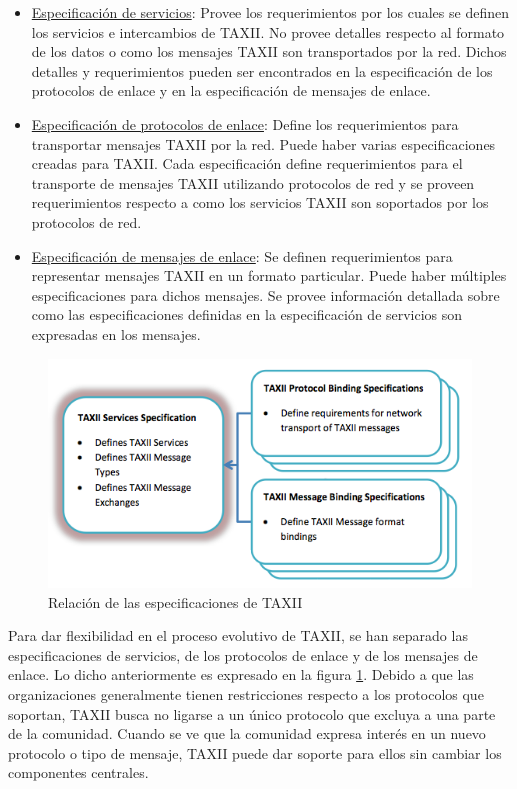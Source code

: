 \begin{itemize}
  \item \underline{Especificación de servicios}: Provee los requerimientos por los cuales se 
  definen los servicios e intercambios de TAXII. No provee detalles respecto al 
  formato de los datos o como los mensajes TAXII son transportados por la red. 
  Dichos detalles y requerimientos pueden ser encontrados en la especificación 
  de los protocolos de enlace y en la especificación de mensajes de enlace.
 \item \underline{Especificación de protocolos de enlace}: Define los requerimientos para 
 transportar mensajes TAXII por la red. Puede haber varias especificaciones 
 creadas para TAXII. Cada especificación define requerimientos para el 
 transporte de mensajes TAXII utilizando protocolos de red y se proveen 
 requerimientos respecto a como los servicios TAXII son soportados por los 
 protocolos de red.
 \item \underline{Especificación de mensajes de enlace}: Se definen requerimientos para 
 representar mensajes TAXII en un formato particular. Puede haber múltiples 
 especificaciones para dichos mensajes. Se provee información detallada sobre 
 como las especificaciones definidas en la especificación de servicios son 
 expresadas en los mensajes.
\end{itemize}

\begin{figure}[ht!]
  \centering
    \includegraphics[width=150mm]{./images/TAXIIEspecification.png}
    \caption{Relación de las especificaciones de TAXII \protect\cite{b1}}
    \label{fig.taxii_rel_spec}
\end{figure}

Para dar flexibilidad en el proceso evolutivo de TAXII, se han separado las 
especificaciones de servicios, de los protocolos de enlace y de los mensajes de 
enlace. Lo dicho anteriormente es expresado en la figura \ref{fig.taxii_rel_spec}.
Debido a que las organizaciones generalmente tienen restricciones 
respecto a los protocolos que soportan, TAXII busca no ligarse a un único 
protocolo que excluya a una parte de la comunidad. Cuando se ve que la comunidad 
expresa interés en un nuevo protocolo o tipo de mensaje, TAXII puede dar soporte 
para ellos sin cambiar los componentes centrales.\\

